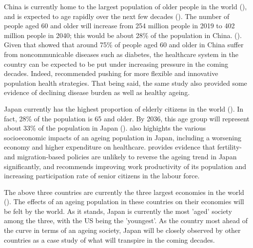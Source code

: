 \documentclass[11pt]{article}
\begin{document}
China is currently home to the largest population of older people in the world (\cite{lancet2022population}), and is expected to age rapidly over the next few decades (\cite{BeardsonTimothy2021Ag:C}). The number of people aged 60 and older will increase from 254 million people in 2019 to 402 million people in 2040; this would be about 28\% of the population in China. (\cite{whochina}). Given that \cite{whochina} showed that around 75\% of people aged 60 and older in China suffer from noncommunicable diseases such as diabetes, the healthcare system in the country can be expected to be put under increasing pressure in the coming decades. Indeed,  \cite{LuoYanan2021TaCf} recommended pushing for more flexible and innovative population health strategies. That being said, the same study also provided some evidence of declining disease burden as well as healthy ageing.

Japan currently has the highest proportion of elderly citizens in the world (\cite{kyodo_2019}). In fact, 28\% of the population is 65 and older. By 2036, this age group will represent about 33\% of the population in Japan (\cite{d2020japan}). \cite{d2020japan} also highights the various socioeconomic impacts of an ageing population in Japan, including a worsening economy and higher expenditure on healthcare. \cite{ParsonsAlexanderJ.Q.2018Aeof} provides evidence that fertility- and migration-based policies are unlikely to reverse the ageing trend in Japan significantly, and recommends improving work productivity of its population and increasing participation rate of senior citizens in the labour force.

The above three countries are currently the three largest economies in the world (\cite{worldbankgdp}). The effects of an ageing population in these countries on their economies will be felt by the world. As it stands, Japan is currently the most 'aged' society among the three, with the US being the 'youngest'. As the country most ahead of the curve in terms of an ageing society, Japan will be closely observed by other countries as a case study of what will transpire in the coming decades.
\end{document}
